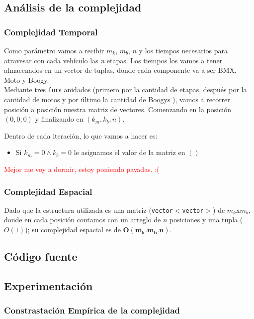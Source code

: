 \newpage
\subsection{An\'alisis de la complejidad}
\subsubsection{Complejidad Temporal}

Como par\'ametro vamos a recibir $m_k$, $m_b$, $n$ y los tiempos necesarios para atravesar con cada veh\'iculo las \emph{n} etapas. Los tiempos los vamos a tener almacenados en un vector de tuplas, donde cada componente va a ser BMX, Moto y Boogy.\\

Mediante tres \texttt{for}s anidados (primero por la cantidad de etapas, despu\'es por la cantidad de motos y por \'ultimo la cantidad de Boogys ), vamos a recorrer posici\'on a posici\'on nuestra matriz de vectores. Comenzando en la posici\'on $(0,0,0)$ y finalizando en  $(k_{m},k_{b},n)$.

Dentro de cada iteraci\'on, lo que vamos a hacer es:

\begin{itemize}
\item Si $k_m=0 \wedge k_b=0$ le asignamos el valor de la matriz en $()$
\end{itemize}

\textcolor{red}{Mejor me voy a dormir, estoy poniendo pavadas. :(}

\subsubsection{Complejidad Espacial}
Dado que la estructura utilizada es una matriz (\texttt{vector$<$vector$>$}) de $m_k$x$m_b$, donde en cada posici\'on contamos con un arreglo de $n$ posiciones y una tupla ($O(1)$); su complejidad espacial es de $\mathbf{O(m_k.m_b.n)}$.

\newpage
\subsection{C\'odigo fuente}
\subsection{Experimentaci\'on}

\subsubsection{Constrastaci\'on Emp\'irica de la complejidad}